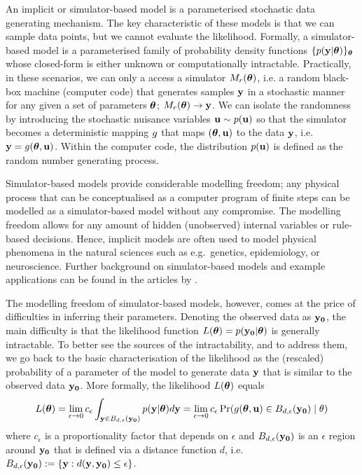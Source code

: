 An implicit or simulator-based model is a parameterised stochastic
data generating mechanism. The key characteristic of these models is
that we can sample data points, but we cannot evaluate the
likelihood. Formally, a simulator-based model is a parameterised
family of probability density functions
\(\{ p(\mathbf{y}|\boldsymbol{\theta}) \}_{\boldsymbol{\theta}}\) whose closed-form is either unknown
or computationally intractable. Practically, in these scenarios, we
can only a access a simulator \( M_r(\boldsymbol{\theta}) \), i.e. a random
black-box machine (computer code) that generates samples \(\mathbf{y}\) in a
stochastic manner for any given a set of parameters \(\boldsymbol{\theta}\);
\( M_r(\boldsymbol{\theta}) \rightarrow \mathbf{y} \). We can isolate the randomness by
introducing the stochastic nuisance variables \(\mathbf{u} \sim p(\mathbf{u})\) so
that the simulator becomes a deterministic mapping \(g\) that
maps \((\boldsymbol{\theta}, \mathbf{u})\) to the data \(\mathbf{y}\), i.e.\
\(\mathbf{y}=g(\boldsymbol{\theta},\mathbf{u})\). Within the computer code, the
distribution \(p(\mathbf{u})\) is defined as the random number generating
process.

Simulator-based models provide considerable modelling freedom; any
physical process that can be conceptualised as a computer program of
finite steps can be modelled as a simulator-based model without any
compromise. The modelling freedom allows for any amount of hidden
(unobserved) internal variables or rule-based decisions. Hence,
implicit models are often used to model physical phenomena in the
natural sciences such as e.g.~genetics, epidemiology, or neuroscience. 
Further background on simulator-based models and
example applications can be found in the articles
by \citet{Gutmann2016, Lintusaari2017, Sisson2018, Cranmer2020}.


The modelling freedom of simulator-based models, however, comes at the
price of difficulties in inferring their parameters. Denoting the
observed data as \(\mathbf{y_0}\), the main difficulty is that the likelihood
function \(L(\boldsymbol{\theta}) = p(\mathbf{y_0}|\boldsymbol{\theta})\) is generally
intractable. To better see the sources of the intractability, and to
address them, we go back to the basic characterisation of the
likelihood as the (rescaled) probability of a parameter of the model
to generate data \(\mathbf{y}\) that is similar to the observed data
\(\mathbf{y_0}\). More formally, the likelihood \(L(\boldsymbol{\theta})\) equals
\begin{equation} \label{eq:likelihood}
  L(\boldsymbol{\theta}) = \lim_{\epsilon \to 0} c_\epsilon \int_{\mathbf{y} \in B_{d,\epsilon}(\mathbf{y_0})} p(\mathbf{y}|\boldsymbol{\theta})d\mathbf{y} =
  \lim_{\epsilon \to 0} c_\epsilon \Pr(g(\boldsymbol{\theta}, \mathbf{u}) \in B_{d,\epsilon}(\mathbf{y_0})  \mid \theta)
\end{equation}
where \(c_\epsilon\) is a proportionality factor that depends on
\(\epsilon\) and \(B_{d,\epsilon}(\mathbf{y_0})\) is an \(\epsilon\) region around \(\mathbf{y_0}\)
that is defined via a distance function \(d\), i.e.\ \(B_{d,\epsilon}(\mathbf{y_0})
:= \{\mathbf{y}: d(\mathbf{y}, \mathbf{y_0}) \leq \epsilon \}\). 

